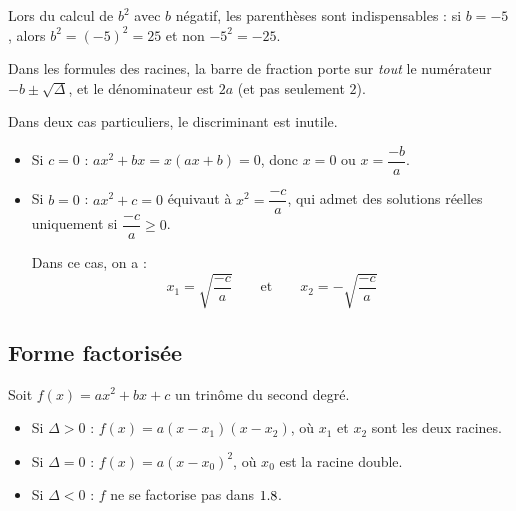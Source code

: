 \begin{piege}
	Lors du calcul de $b^2$ avec $b$ négatif, les parenthèses sont indispensables : si $b = -5$, alors $b^2 = (-5)^2 = 25$ et non $-5^2 = -25$.
\end{piege}

\begin{attention}
	Dans les formules des racines, la barre de fraction porte sur \emph{tout} le numérateur $-b \pm \sqrt{\Delta}$, et le dénominateur est $2a$ (et pas seulement $2$).
\end{attention}

\begin{rem}
	Dans deux cas particuliers, le discriminant est inutile.
	\begin{itemize}
		\item Si $c = 0$ : $ax^2 + bx = x(ax + b) = 0$, donc $x = 0$ ou $x = \dfrac{-b}{a}$.
		\item Si $b = 0$ : $ax^2 + c = 0$ équivaut à $x^2 = \dfrac{-c}{a}$, qui admet des solutions réelles uniquement si $\dfrac{-c}{a} \geq 0$.

		      Dans ce cas, on a :
		      \[
			      x_1=\sqrt{\dfrac{-c}{a}}\qquad\text{et}\qquad x_2=-\sqrt{\dfrac{-c}{a}}
		      \]
	\end{itemize}
\end{rem}

\subsection{Forme factorisée}

\begin{prop}
	Soit $f(x) = ax^2 + bx + c$ un trinôme du second degré.
	\begin{itemize}
		\item Si $\Delta > 0$ : $f(x) = a(x - x_1)(x - x_2)$, où $x_1$ et $x_2$ sont les deux racines.
		\item Si $\Delta = 0$ : $f(x) = a(x - x_0)^2$, où $x_0$ est la racine double.
		\item Si $\Delta < 0$ : $f$ ne se factorise pas dans $1.8$.
	\end{itemize}
\end{prop}

